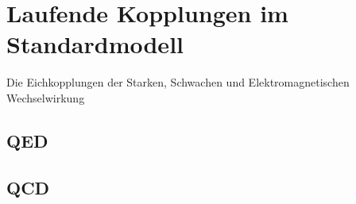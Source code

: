 \clearpage
\section{Laufende Kopplungen im Standardmodell}

  Die Eichkopplungen der Starken, Schwachen und Elektromagnetischen Wechselwirkung \cite{PDG:QCD}
  
  \subsection{QED}
  
  \subsection{QCD}